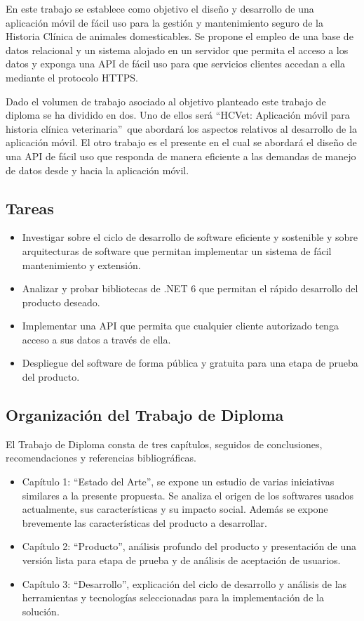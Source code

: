 En este trabajo se establece como objetivo el diseño y desarrollo de una aplicación móvil de fácil uso para la gestión y mantenimiento seguro de la Historia Clínica de animales domesticables. Se propone el empleo de una base de datos relacional y un sistema alojado en un servidor que permita el acceso a los datos y exponga una API de fácil uso para que servicios clientes accedan a ella mediante el protocolo HTTPS.

Dado el volumen de trabajo asociado al objetivo planteado este trabajo de diploma se ha dividido en dos. Uno de ellos será \textquotedblleft HCVet: Aplicación móvil para historia clínica veterinaria\textquotedblright\ que abordará los aspectos relativos al desarrollo de la aplicación móvil. El otro trabajo es el presente en el cual se abordará el diseño de una API de fácil uso que responda de manera eficiente a las demandas de manejo de datos desde y hacia la aplicación móvil.

\subsection*{Tareas}

\begin{itemize}
\item Investigar sobre el ciclo de desarrollo de software eficiente y sostenible y sobre arquitecturas de software que permitan implementar un sistema de fácil mantenimiento y extensión.
\item Analizar y probar bibliotecas de .NET 6 que permitan el rápido desarrollo del producto deseado.
\item Implementar una API que permita que cualquier cliente autorizado tenga acceso a sus datos a través de ella.
\item Despliegue del software de forma pública y gratuita para una etapa de prueba del producto.
\end{itemize}

\subsection*{Organizaci\'on del Trabajo de Diploma}

El Trabajo de Diploma consta de tres capítulos, seguidos de conclusiones, recomendaciones y referencias bibliográficas.
\begin{itemize}

\item Capítulo 1: “Estado del Arte”, se expone un estudio de varias iniciativas similares a la presente propuesta. Se analiza el origen de los softwares usados actualmente, sus características y su impacto social. Además se expone brevemente las características del producto a desarrollar.

\item Capítulo 2: “Producto”, análisis profundo del producto y presentación de una versión lista para etapa de prueba y de análisis de aceptación de usuarios. 

\item Capítulo 3: “Desarrollo”, explicación del ciclo de desarrollo y análisis de las herramientas y tecnologías seleccionadas para la implementación de la solución.


\end{itemize}
